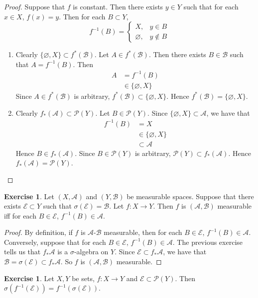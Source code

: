 \documentclass{book}
\theoremstyle{definition}
\newtheorem{ex}[definition]{Exercise}
\newcommand{\sig}{\sigma}
\newcommand{\MA}{\mathcal{A}}
\newcommand{\MB}{\mathcal{B}}
\newcommand{\ME}{\mathcal{E}}
\newcommand{\MP}{\mathcal{P}}
\newcommand{\lex}[1]{\label{ex:#1}}
\DeclareMathOperator*{\0}{\mbf{0}}
\DeclareMathOperator*{\1}{\mbf{1}}
\begin{document}
	\begin{proof} Suppose that $f$ is constant. Then there exists $y \in Y$ such that for each $x \in X$, $f(x) = y$. Then for each $B \subset Y$, $$f^{-1}(B) = 
		\begin{cases}
			X, & y \in B \\
			\varnothing, & y \not \in B
		\end{cases}
		$$
		\begin{enumerate}
			\item Clearly $\{\varnothing, X\} \subset f^*(\MB)$. Let $A \in f^{*}(\MB)$. Then there exists $B \in \MB$ such that $A = f^{-1}(B)$. Then 
			\begin{align*}
				A
				& = f^{-1}(B) \\
				& \in \{\varnothing, X\}
			\end{align*}
			Since $A \in f^*(\MB)$ is arbitrary, $f^*(\MB) \subset \{\varnothing, X\}$. Hence $f^*(\MB) = \{\varnothing, X\}$.
			\item Clearly $f_*(\MA) \subset \MP(Y)$. Let $B \in \MP(Y)$. Since $\{\varnothing, X\} \subset \MA$, we have that 
			\begin{align*}
				f^{-1}(B) 
				& = X \\
				& \in \{\varnothing, X\} \\
				& \subset \MA
			\end{align*}
			Hence $B \in f_*(\MA)$. Since $B \in \MP(Y)$ is arbitrary, $\MP(Y) \subset f_*(\MA)$. Hence $f_*(\MA) = \MP(Y)$.
		\end{enumerate}
	\end{proof}
	
	\begin{ex} \lex{00000} 
		Let $(X,\MA)$ and $(Y, \MB)$ be measurable spaces. Suppose that there exists $\ME \subset Y$ such that $\sig(\ME) = \MB$. Let $f:X \rightarrow Y$. Then $f$ is $(\MA,\MB)$ measurable iff for each $B \in \ME$, $f^{-1}(B) \in \MA$.
	\end{ex}
	
	\begin{proof}
		By definition, if $f$ is $\MA$-$\MB$ measurable, then for each $B \in \ME$, $f^{-1}(B) \in \MA$. Conversely, suppose that for each $B \in \ME$, $f^{-1}(B) \in \MA$. The previous exercise tells us that $f_*\MA$ is a $\sig$-algebra on $Y$. Since $\ME \subset f_*\MA$, we have that $\MB = \sig(\ME) \subset f_*\MA$. So $f$ is $(\MA,\MB)$ measurable.
	\end{proof}
	
	\begin{ex} \lex{00000} 
		Let $X,Y$ be sets, $f:X \rightarrow Y$ and $\ME \subset \MP(Y)$. Then $\sig(f^{-1}(\ME)) = f^{-1}(\sig(\ME))$. 
	\end{ex}
	
\end{document}
